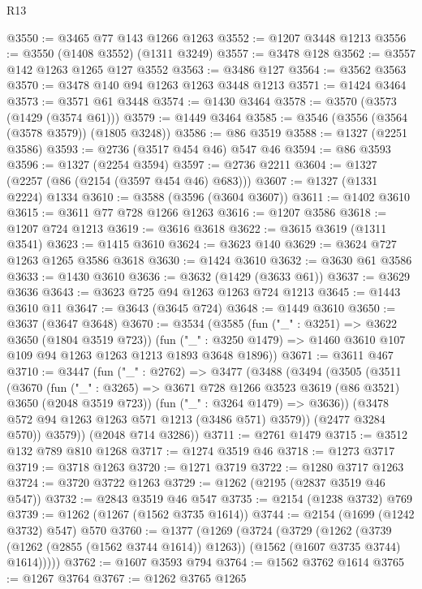 \begin{lexlean}{R13}
\begin{coremodule}
@3550 := @3465 @77 @143 @1266 @1263
@3552 := @1207 @3448 @1213
@3556 := @3550 (@1408 @3552) (@1311 @3249)
@3557 := @3478 @128
@3562 := @3557 @142 @1263 @1265 @127 @3552
@3563 := @3486 @127
@3564 := @3562 @3563
@3570 := @3478 @140 @94 @1263 @1263 @3448 @1213
@3571 := @1424 @3464
@3573 := @3571 @61 @3448
@3574 := @1430 @3464
@3578 := @3570 (@3573 (@1429 (@3574 @61)))
@3579 := @1449 @3464
@3585 := @3546 (@3556 (@3564 (@3578 @3579)) (@1805 @3248))
@3586 := @86 @3519
@3588 := @1327 (@2251 @3586)
@3593 := @2736 (@3517 @454 @46) @547 @46
@3594 := @86 @3593
@3596 := @1327 (@2254 @3594)
@3597 := @2736 @2211
@3604 := @1327 (@2257 (@86 (@2154 (@3597 @454 @46) @683)))
@3607 := @1327 (@1331 @2224) @1334
@3610 := @3588 (@3596 (@3604 @3607))
@3611 := @1402 @3610
@3615 := @3611 @77 @728 @1266 @1263
@3616 := @1207 @3586
@3618 := @1207 @724 @1213
@3619 := @3616 @3618
@3622 := @3615 @3619 (@1311 @3541)
@3623 := @1415 @3610
@3624 := @3623 @140
@3629 := @3624 @727 @1263 @1265 @3586 @3618
@3630 := @1424 @3610
@3632 := @3630 @61 @3586
@3633 := @1430 @3610
@3636 := @3632 (@1429 (@3633 @61))
@3637 := @3629 @3636
@3643 := @3623 @725 @94 @1263 @1263 @724 @1213
@3645 := @1443 @3610 @11
@3647 := @3643 (@3645 @724)
@3648 := @1449 @3610
@3650 := @3637 (@3647 @3648)
@3670 := @3534
    (@3585
      (fun ("_" : @3251) => @3622 @3650 (@1804 @3519 @723))
      (fun ("_" : @3250 @1479) => @1460 @3610 @107 @109 @94 @1263 @1263 @1213 @1893 @3648 @1896))
@3671 := @3611 @467
@3710 := @3447
    (fun ("_" : @2762) =>
    @3477
      (@3488
        (@3494
          (@3505
            (@3511
              (@3670
                (fun ("_" : @3265) =>
                @3671 @728 @1266 @3523 @3619 (@86 @3521) @3650 (@2048 @3519 @723))
                (fun ("_" : @3264 @1479) => @3636))
              (@3478 @572 @94 @1263 @1263 @571 @1213 (@3486 @571) @3579))
            (@2477 @3284 @570))
          @3579))
      (@2048 @714 @3286))
@3711 := @2761 @1479
@3715 := @3512 @132 @789 @810 @1268
@3717 := @1274 @3519 @46
@3718 := @1273 @3717
@3719 := @3718 @1263
@3720 := @1271 @3719
@3722 := @1280 @3717 @1263
@3724 := @3720 @3722 @1263
@3729 := @1262 (@2195 (@2837 @3519 @46 @547))
@3732 := @2843 @3519 @46 @547
@3735 := @2154 (@1238 @3732) @769
@3739 := @1262 (@1267 (@1562 @3735 @1614))
@3744 := @2154 (@1699 (@1242 @3732) @547) @570
@3760 := @1377
    (@1269
      (@3724
        (@3729
          (@1262
            (@3739 (@1262 (@2855 (@1562 @3744 @1614)) @1263))
            (@1562 (@1607 @3735 @3744) @1614)))))
@3762 := @1607 @3593 @794
@3764 := @1562 @3762 @1614
@3765 := @1267 @3764
@3767 := @1262 @3765 @1265

\end{coremodule}
\end{lexlean}

